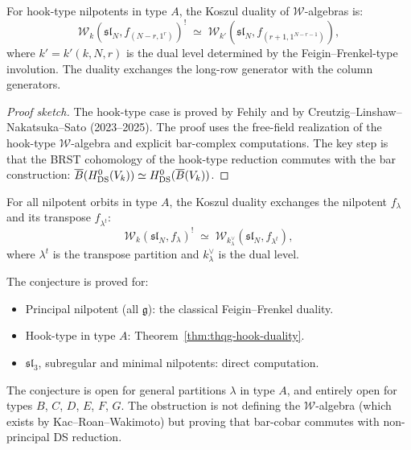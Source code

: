 \begin{theorem}
\label{thm:thqg-hook-duality}
For hook-type nilpotents in type $A$, the Koszul duality of
$\mathcal{W}$-algebras is:
\begin{equation}%
\mathcal{W}_k(\mathfrak{sl}_N, f_{(N-r,1^r)})^!
\;\simeq\;
\mathcal{W}_{k'}\!(\mathfrak{sl}_N, f_{(r+1, 1^{N-r-1})}),
\end{equation}
where $k' = k'(k, N, r)$ is the dual level determined by the
Feigin--Frenkel-type involution. The duality exchanges the long-row
generator with the column generators.
\end{theorem}

\begin{proof}[Proof sketch]
The hook-type case is proved by Fehily and by
Creutzig--Linshaw--Nakatsuka--Sato (2023--2025). The proof uses
the free-field realization of the hook-type $\mathcal{W}$-algebra and
explicit bar-complex computations. The key step is that the BRST
cohomology of the hook-type reduction commutes with the bar
construction: $\overline{B}(H^0_{\mathrm{DS}}(V_k)) \simeq
H^0_{\mathrm{DS}}(\overline{B}(V_k))$.
\end{proof}


\begin{conjecture}
For all nilpotent orbits in type $A$, the Koszul duality exchanges
the nilpotent $f_\lambda$ and its transpose $f_{\lambda^t}$:
\begin{equation}%
\mathcal{W}_k(\mathfrak{sl}_N, f_\lambda)^!
\;\simeq\;
\mathcal{W}_{k^\vee_\lambda}(\mathfrak{sl}_N, f_{\lambda^t}),
\end{equation}
where $\lambda^t$ is the transpose partition and $k^\vee_\lambda$
is the dual level.
\end{conjecture}

\begin{remark}
The conjecture is proved for:
\begin{itemize}
\item Principal nilpotent (all $\mathfrak{g}$): the classical
 Feigin--Frenkel duality.
\item Hook-type in type $A$: Theorem~\ref{thm:thqg-hook-duality}.
\item $\mathfrak{sl}_3$, subregular and minimal nilpotents:
 direct computation.
\end{itemize}
The conjecture is open for general partitions $\lambda$ in type $A$,
and entirely open for types $B$, $C$, $D$, $E$, $F$, $G$. The
obstruction is not defining the $\mathcal{W}$-algebra (which exists
by Kac--Roan--Wakimoto) but proving that bar-cobar commutes with
non-principal DS reduction.
\end{remark}


